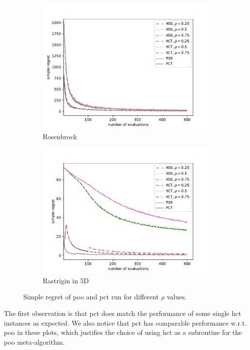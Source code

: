 \begin{figure}[ht]
\begin{subfigure}{0.33\textwidth}
    \centering\includegraphics[width=\textwidth]{Chapter5/img/rosenbrock_plot.pdf}
    \caption{Rosenbrock}
  \end{subfigure}
  \begin{subfigure}{0.33\textwidth}
    \centering\includegraphics[width=\textwidth]{Chapter5/img/rastrigin_plot.pdf}
    \caption{Rastrigin in 5D}
  \end{subfigure}
  \caption{Simple regret of \gls{poo} and \gls{pct} run for different $\rho$ values.}
  \label{fig:results}
\end{figure}

The first observation is that \gls{pct} does match the performance of some single \gls{hct} instances as expected. We also notice that \gls{pct} has comparable performance w.r.t.\,\gls{poo} in these plots, which justifies the choice of using \gls{hct} as a subroutine for the \gls{poo} meta-algorithm.
